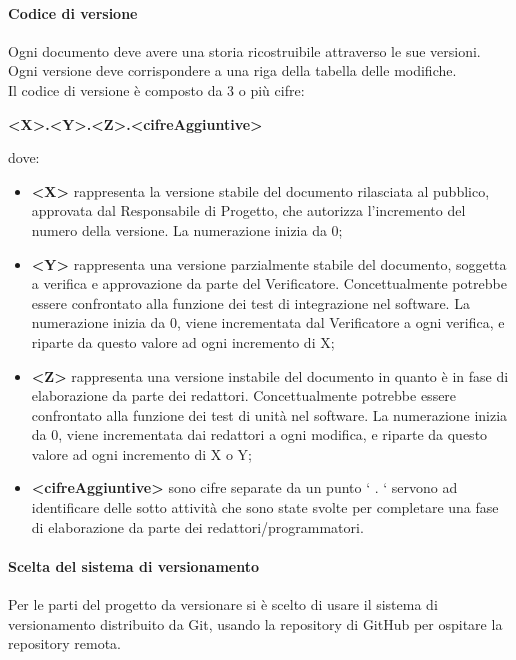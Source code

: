 			\paragraph{Codice di versione}
				Ogni documento deve avere una storia ricostruibile attraverso le sue versioni.  \\
				Ogni versione deve corrispondere a una riga della tabella delle modifiche. \\
				Il codice di versione è composto da 3 o più cifre: \\
				\begin{center}
					\textbf{<X>.<Y>.<Z>.<cifreAggiuntive>}
				\end{center}
				dove:
				\begin{itemize}
					\item\textbf{<X>} rappresenta la versione stabile del documento rilasciata al pubblico, approvata dal Responsabile di Progetto, che autorizza l’incremento del numero della versione. La numerazione inizia da 0;
					\item\textbf{<Y>} rappresenta una versione parzialmente stabile del documento, soggetta a verifica e approvazione da parte del Verificatore. Concettualmente potrebbe essere confrontato alla funzione dei test di integrazione nel software. La numerazione inizia da 0, viene incrementata dal Verificatore a ogni verifica, e riparte da questo valore ad ogni incremento di X;
					\item\textbf{<Z>} rappresenta una versione instabile del documento in quanto è in fase di elaborazione da parte dei redattori. Concettualmente potrebbe essere confrontato alla funzione dei test di unità nel software. La numerazione inizia da 0, viene incrementata dai redattori a ogni modifica, e riparte da questo valore ad ogni incremento di X o Y;
					\item\textbf{<cifreAggiuntive>} sono cifre separate da un punto ‘ . ‘ servono ad identificare delle sotto attività che sono state svolte per completare una fase di elaborazione da parte dei redattori/programmatori.
				\end{itemize}
			\paragraph{Scelta del sistema di versionamento}
				Per le parti del progetto da versionare si è scelto di usare il sistema di versionamento distribuito da Git, usando la repository di GitHub per ospitare la repository remota.
